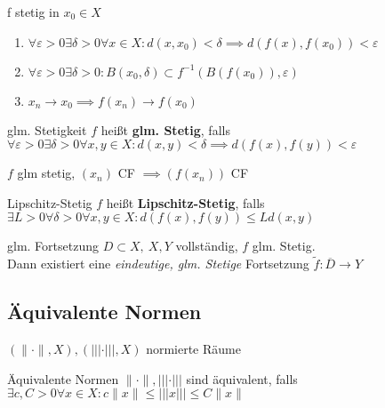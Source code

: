 \begin{bemerkung}
  f stetig in $x_0 \in X$
  \begin{enumerate}[label= $\Leftrightarrow$]
    \item $\forall \varepsilon >0 \exists \delta >0 \forall x \in X:
      d(x,x_0)<\delta \implies d(f(x),f(x_0)) < \varepsilon$
    \item $\forall \varepsilon >0 \exists \delta >0:
      B(x_0,\delta) \subset f^{-1}(B(f(x_0)), \varepsilon)$
    \item $x_n \to x_0 \implies f(x_n) \to f(x_0)$
  \end{enumerate}
\end{bemerkung}

\begin{definition}{glm. Stetigkeit}
  $f$ heißt \textbf{glm. Stetig}, falls
  $\forall \varepsilon >0 \exists \delta >0 \forall x,y \in X:
  d(x,y) < \delta \implies d(f(x),f(y)) < \varepsilon$
\end{definition}

\begin{bemerkung}
    $f$ glm stetig, $(x_n)$ CF $\implies (f(x_n))$ CF
\end{bemerkung}

\begin{definition}{Lipschitz-Stetig}
  $f$ heißt \textbf{Lipschitz-Stetig}, falls
  $\exists L >0 \forall \delta >0 \forall x,y \in X:
  d(f(x),f(y)) \leq L d(x,y)$
\end{definition}

\begin{satz}{glm. Fortsetzung}
  $D\subset X,\ X,Y$ vollständig, $f$ glm. Stetig.\\
  Dann existiert eine \textit{eindeutige, glm. Stetige} Fortsetzung
  $\tilde{f}: \overline{D} \to Y$
\end{satz}



\subsection{Äquivalente Normen}

$(\|\cdot\|, X), (|||\cdot|||, X)$ normierte Räume\\

\begin{definition}{Äquivalente Normen}
  $\|\cdot\|, |||\cdot|||$ sind äquivalent, falls
  $\exists c,C>0 \forall x\in X: c\|x\| \leq |||x||| \leq C \|x\|$
\end{definition}

